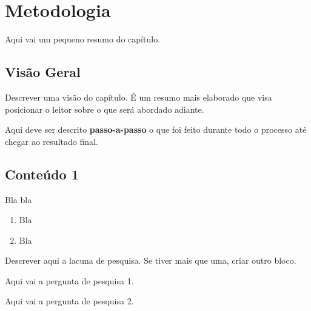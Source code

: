 \chapter{Metodologia}
\label{ch:identificador}
	\begin{resumocapitulo}
		Aqui vai um pequeno resumo do capítulo.
	\end{resumocapitulo}

	\section{Visão Geral}
		Descrever uma visão do capítulo. É um resumo mais elaborado que visa posicionar o leitor sobre o que será abordado adiante.

		Aqui deve ser descrito \textbf{passo-a-passo} o que foi feito durante todo o processo até chegar ao resultado final.

	\section{Conteúdo 1}
	\label{sec:identificao}
        Bla bla

		\begin{enumerate}
			\item Bla
			\item Bla
		\end{enumerate}

		\begin{lacuna}
		\label{lacuna:lacuna1}
			Descrever aqui a lacuna de pesquisa. Se tiver mais que uma, criar outro bloco.
		\end{lacuna}
	
		\begin{pergunta}
		\label{pergunta:pergunta_1}
			Aqui vai a pergunta de pesquisa 1.
		\end{pergunta}

		\begin{pergunta}
		\label{pergunta:pergunta_2}
			Aqui vai a pergunta de pesquisa 2.
		\end{pergunta}	